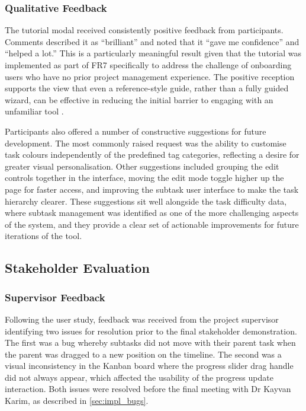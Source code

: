 \documentclass[12pt,nonacm,acmlarge,titlepage,screen]{acmart}
\begin{document}
\subsubsection{Qualitative Feedback}

The tutorial modal received consistently positive feedback from participants.
Comments described it as ``brilliant'' and noted that it ``gave me confidence'' and
``helped a lot.'' This is a particularly meaningful result given that the tutorial was
implemented as part of FR7 specifically to address the challenge of onboarding users
who have no prior project management experience. The positive reception supports the
view that even a reference-style guide, rather than a fully guided wizard, can be
effective in reducing the initial barrier to engaging with an unfamiliar tool
\cite{Shives2015}.

Participants also offered a number of constructive suggestions for future
development. The most commonly raised request was the ability to customise task
colours independently of the predefined tag categories, reflecting a desire for
greater visual personalisation. Other suggestions included grouping the edit
controls together in the interface, moving the edit mode toggle higher up the page
for faster access, and improving the subtask user interface to make the task
hierarchy clearer. These suggestions sit well alongside the task difficulty data,
where subtask management was identified as one of the more challenging aspects of
the system, and they provide a clear set of actionable improvements for future
iterations of the tool.

\subsection{Stakeholder Evaluation} \label{sec:eval_stakeholder}

\subsubsection{Supervisor Feedback}

Following the user study, feedback was received from the project supervisor
identifying two issues for resolution prior to the final stakeholder demonstration.
The first was a bug whereby subtasks did not move with their parent task when the
parent was dragged to a new position on the timeline. The second was a visual
inconsistency in the Kanban board where the progress slider drag handle did not
always appear, which affected the usability of the progress update interaction. Both
issues were resolved before the final meeting with Dr Kayvan Karim, as described in
\cref{sec:impl_bugs}.
\end{document}
